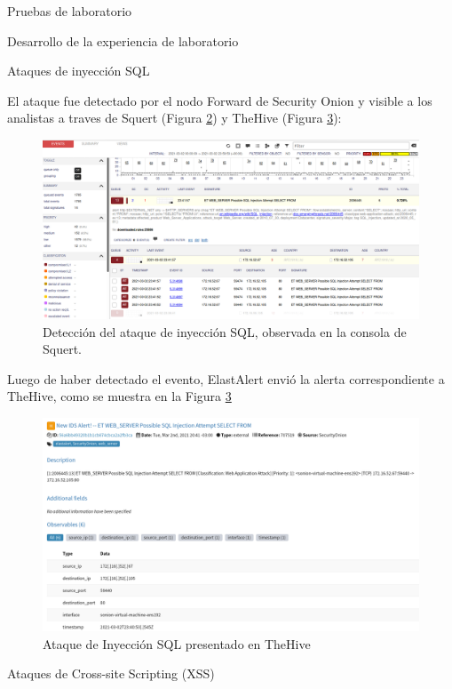 \begin{section}{Pruebas de laboratorio}
\begin{subsection}{Desarrollo de la experiencia de laboratorio}
\begin{subsubsection}{Ataques de inyección SQL}
\begin{figure}[H]
    \label{fig:sql-dvwa}
    \end{figure}
    \FloatBarrier 
    El ataque fue detectado por el nodo Forward de Security Onion y visible a los analistas a traves de Squert (Figura \ref{fig:sql-squert}) y TheHive (Figura \ref{fig:sql-thehive}):
     \begin{figure}[H]
    \centering
    \includegraphics[width=1\textwidth]{./iteracion_3_imagenes/sql-squert.png}
    \caption{Detección del ataque de inyección SQL, observada en la consola de Squert.}
    \label{fig:sql-squert}
    \end{figure}
    \FloatBarrier 
    Luego de haber detectado el evento, ElastAlert envió la alerta correspondiente a TheHive, como se muestra en la Figura \ref{fig:sql-thehive}
    \begin{figure}[H]
    \centering
    \includegraphics[width=1\textwidth]{./iteracion_3_imagenes/sql-thehive.png}
    \caption{Ataque de Inyección SQL presentado en TheHive}
    \label{fig:sql-thehive}
    \end{figure}
    \FloatBarrier  
    \end{subsubsection}
    \begin{subsubsection} {Ataques de Cross-site Scripting (XSS)}

\end{subsubsection}
\end{subsection}
\end{section}
